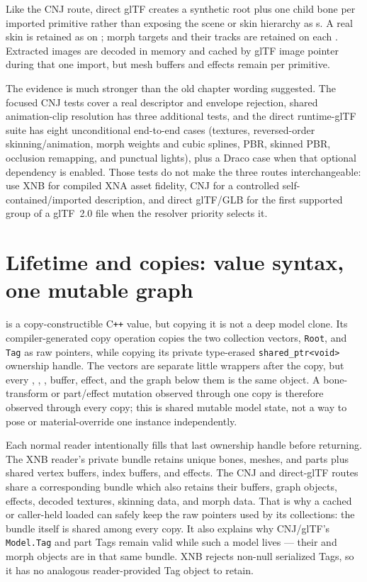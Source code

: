 \begin{description}
        Like the CNJ route, direct glTF creates a synthetic root plus one child bone per imported
        primitive rather than exposing the scene or skin hierarchy as s.
        A real skin is retained as  on ; morph
        targets and their tracks are retained on each . Extracted
        images are decoded in memory and cached by glTF image pointer during that one import, but
        mesh buffers and effects remain per primitive.
\end{description}

The evidence is much stronger than the old chapter wording suggested. The focused CNJ tests
cover a real descriptor and envelope rejection, shared animation-clip resolution has three
additional tests, and the direct runtime-glTF suite has eight unconditional end-to-end cases
(textures, reversed-order skinning/animation, morph weights and cubic splines, PBR, skinned PBR,
occlusion remapping, and punctual lights), plus a Draco case when that optional dependency is
enabled. Those tests do not make the three routes interchangeable: use XNB for compiled XNA
asset fidelity, CNJ for a controlled self-contained/imported description, and direct glTF/GLB
for the first supported group of a glTF~2.0 file when the resolver priority selects it.

\section{Lifetime and copies: value syntax, one mutable graph}
\label{sec:model-lifetime-copy}

 is a copy-constructible C\texttt{++} value, but copying it is not a deep model
clone. Its compiler-generated copy operation copies the two collection vectors, \texttt{Root},
and \texttt{Tag} as raw pointers, while copying its private type-erased
\texttt{shared\_ptr<void>} ownership handle. The vectors are separate little wrappers after the
copy, but every , , , buffer,
effect, and the graph below them is the same object. A bone-transform or part/effect mutation
observed through one copy is therefore observed through every copy; this is shared mutable model
state, not a way to pose or material-override one instance independently.

Each normal reader intentionally fills that last ownership handle before returning. The XNB
reader's private bundle retains unique bones, meshes, and parts plus shared vertex buffers,
index buffers, and effects. The CNJ and direct-glTF routes share a corresponding bundle which
also retains their buffers, graph objects, effects, decoded textures, skinning data, and morph
data. That is why a cached or caller-held loaded  can safely keep the raw
pointers used by its collections: the bundle itself is shared among every copy. It also explains
why CNJ/glTF's \texttt{Model.Tag} and part Tags remain valid while such a model lives --- their
 and morph objects are in that same bundle. XNB rejects non-null serialized
Tags, so it has no analogous reader-provided Tag object to retain.

